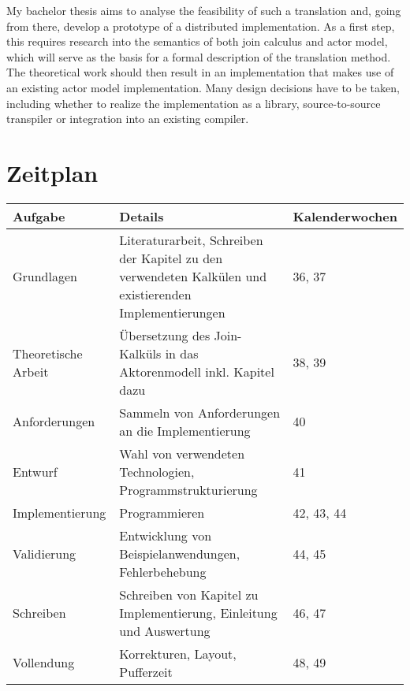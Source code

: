 \documentclass[12pt]{article}
\begin{document}
My bachelor thesis aims to analyse the feasibility of such a translation and, going from there, develop a prototype of a distributed implementation.
As a first step, this requires research into the semantics of both join calculus and actor model, which will serve as the basis for a formal description of the translation method.
The theoretical work should then result in an implementation that makes use of an existing actor model implementation.
Many design decisions have to be taken, including whether to realize the implementation as a library, source-to-source transpiler or integration into an existing compiler.


\section*{Zeitplan}

\begin{tabular}{| p{3cm} | p{7cm} | p{3cm} |}
  \hline
    Aufgabe &
    Details &
    Kalenderwochen \\
  \hline
    Grundlagen &
    Literaturarbeit, Schreiben der Kapitel zu den verwendeten Kalkülen und existierenden Implementierungen &
    36, 37 \\
  \hline
    Theoretische \newline Arbeit &
    Übersetzung des Join-Kalküls in das Aktorenmodell inkl. Kapitel dazu &
    38, 39 \\
  \hline
    Anforderungen &
    Sammeln von Anforderungen an die Implementierung &
    40 \\
  \hline
    Entwurf &
    Wahl von verwendeten Technologien, Programmstrukturierung &
    41 \\
  \hline
    Implementierung &
    Programmieren &
    42, 43, 44 \\
  \hline
    Validierung &
    Entwicklung von Beispiel\-anwendungen, Fehlerbehebung &
    44, 45 \\
  \hline
    Schreiben &
    Schreiben von Kapitel zu Implementierung, Einleitung und Auswertung &
    46, 47 \\
  \hline
    Vollendung &
    Korrekturen, Layout, Pufferzeit &
    48, 49 \\
  \hline
\end{tabular}

\nocite{levy_results_1997}
\nocite{maranget_compiling_1998}

{}

\end{document}
